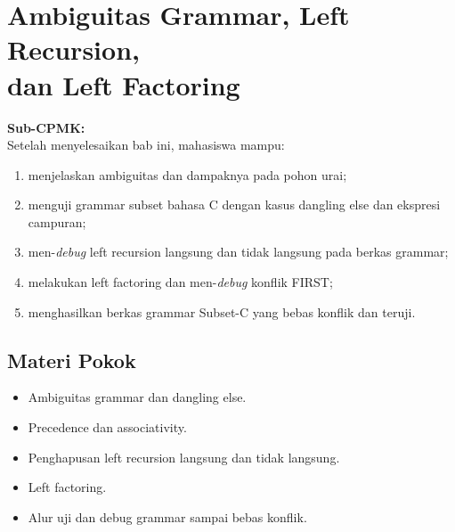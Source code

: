 \documentclass[../../main.tex]{subfiles}
\begin{document}
\chapter[Ambiguitas dan Transformasi Grammar]{Ambiguitas Grammar, Left Recursion,\\ dan Left Factoring}
\label{chap:ambiguitas}

\begin{outcomebox}
\textbf{Sub-CPMK:} \\[3pt]
Setelah menyelesaikan bab ini, mahasiswa mampu:
\begin{enumerate}[label=\arabic*.,leftmargin=*]
  \item menjelaskan ambiguitas dan dampaknya pada pohon urai;
  \item menguji grammar subset bahasa C dengan kasus dangling else dan
        ekspresi campuran;
  \item men-\textit{debug} left recursion langsung dan tidak langsung
        pada berkas grammar;
  \item melakukan left factoring dan men-\textit{debug} konflik FIRST;
  \item menghasilkan berkas grammar Subset-C yang bebas konflik dan
        teruji.
\end{enumerate}
\end{outcomebox}

\section*{Materi Pokok}
\begin{itemize}[leftmargin=*]
  \item Ambiguitas grammar dan dangling else.
  \item Precedence dan associativity.
  \item Penghapusan left recursion langsung dan tidak langsung.
  \item Left factoring.
  \item Alur uji dan debug grammar sampai bebas konflik.
\end{itemize}















\ifSubfilesClassLoaded{%
}{}
\end{document}

